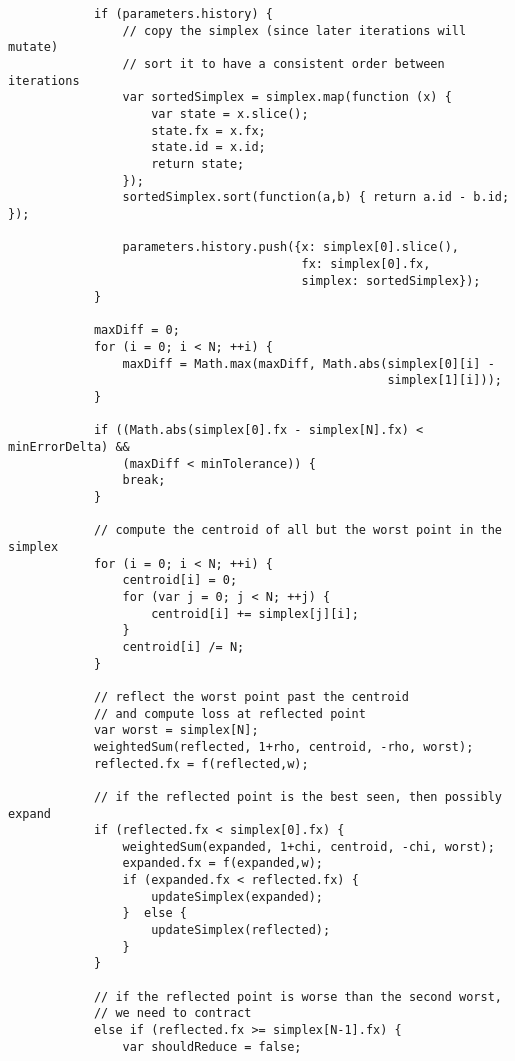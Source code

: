 \documentclass[11pt]{article}
\begin{document}
\begin{lstlisting}
            if (parameters.history) {
                // copy the simplex (since later iterations will mutate)
                // sort it to have a consistent order between iterations
                var sortedSimplex = simplex.map(function (x) {
                    var state = x.slice();
                    state.fx = x.fx;
                    state.id = x.id;
                    return state;
                });
                sortedSimplex.sort(function(a,b) { return a.id - b.id; });

                parameters.history.push({x: simplex[0].slice(),
                                         fx: simplex[0].fx,
                                         simplex: sortedSimplex});
            }

            maxDiff = 0;
            for (i = 0; i < N; ++i) {
                maxDiff = Math.max(maxDiff, Math.abs(simplex[0][i] -
                                                     simplex[1][i]));
            }

            if ((Math.abs(simplex[0].fx - simplex[N].fx) < minErrorDelta) &&
                (maxDiff < minTolerance)) {
                break;
            }

            // compute the centroid of all but the worst point in the simplex
            for (i = 0; i < N; ++i) {
                centroid[i] = 0;
                for (var j = 0; j < N; ++j) {
                    centroid[i] += simplex[j][i];
                }
                centroid[i] /= N;
            }

            // reflect the worst point past the centroid
            // and compute loss at reflected point
            var worst = simplex[N];
            weightedSum(reflected, 1+rho, centroid, -rho, worst);
            reflected.fx = f(reflected,w);

            // if the reflected point is the best seen, then possibly expand
            if (reflected.fx < simplex[0].fx) {
                weightedSum(expanded, 1+chi, centroid, -chi, worst);
                expanded.fx = f(expanded,w);
                if (expanded.fx < reflected.fx) {
                    updateSimplex(expanded);
                }  else {
                    updateSimplex(reflected);
                }
            }

            // if the reflected point is worse than the second worst,
            // we need to contract
            else if (reflected.fx >= simplex[N-1].fx) {
                var shouldReduce = false;


\end{lstlisting}
\end{document}
